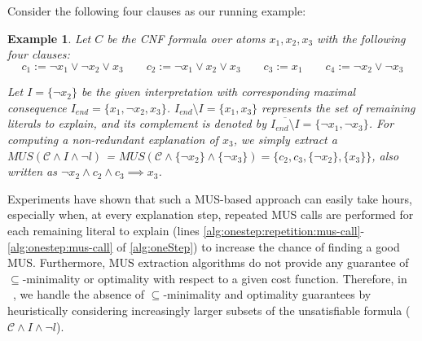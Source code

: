 \documentclass[twoside,11pt]{article}
\newcommand\citet[1]{\citeauthor{#1}~\citeyear{#1}}
\newcommand\m[1]{\mathcal{#1}}
\newtheorem{example}{Example}
\newcommand\comment[1]{\marginpar{\tiny #1}}
\renewcommand\comment[1]{#1}
\newcommand{\tias}[1]{{\comment{\color{blue}Tias:#1}}}
\newcommand{\emilio}[1]{{\comment{\color{red}Emilio: #1}}}
\newcommand{\bart}[1]{{\comment{\color{OliveGreen}Bart: #1}}}
\newcommand{\removed}[1]{\sout{#1}}
\newcommand\Iend{\ensuremath{I_\mathit{end} }\xspace}
\newcommand\formulac{\ensuremath{\m{C} }\xspace}
\newcommand\formularunning{\ensuremath{C }\xspace}
\newcommand\mm[1]{\ensuremath{#1}\xspace}
\newcommand\negset[1]{\mm{\overline{#1}}}
\begin{document}
Consider the following four clauses as our running example:
\begin{example}\label{example:intro}%
	Let $\formularunning$
	be the CNF formula over atoms $x_1, x_2, x_3$ with the following four clauses:
	\[ c_1 := \lnot x_1 \vee \lnot x_2 \vee x_3 \qquad  c_2 := \lnot x_1 \vee  x_2 \vee x_3 \qquad  c_3 := x_1 \qquad c_4 := \lnot x_2 \vee \lnot x_3 \]
	
	Let $I = \{\lnot x_2\}$ be the given \emph{interpretation} with corresponding maximal consequence $\Iend = \{x_1, \lnot x_2,  x_3\}$.
  $\Iend \setminus I = \{x_1, x_3\}$ represents the set of remaining literals to explain, and its complement is denoted by $\negset{\Iend \setminus I} = \{\lnot x_1, \lnot x_3\}$. For computing a non-redundant explanation of $x_3$, we simply extract a $MUS(\formulac \land I \land \neg l)$ = $MUS(\formulac \wedge \{\lnot x_2\} \wedge \{\lnot x_3\}) = \{ c_2 , c_3, \{\lnot x_2\}, \{x_3\} \}$, also written as $\lnot x_2 \wedge c_2 \wedge c_3 \implies x_3 $.
\end{example}

Experiments have shown that such a MUS-based approach can easily take hours, especially when, at every explanation step, repeated MUS calls are performed for each remaining literal to explain (lines \ref{alg:onestep:repetition:mus-call}-\ref{alg:onestep:mus-call} of \cref{alg:oneStep}) to increase the chance of finding a good MUS. 
Furthermore, MUS extraction algorithms do not provide any guarantee of $\subseteq$-minimality or optimality with respect to a given cost function. Therefore, in \citet{bogaerts2021framework}, we handle the absence of $\subseteq$-minimality and optimality guarantees by heuristically considering increasingly larger subsets of the unsatisfiable formula ($\formulac \land I \land \neg l$).
\end{document}
